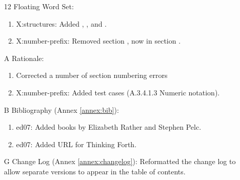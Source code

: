 \begin{itemize}
	\item[12] Floating Word Set:
		\begin{enumerate}
		\item \textsf{X:structures}: Added
			,
			, and
			.
		\item \textsf{X:number-prefix}:
			Removed section , now
			in section .
		\end{enumerate}

	\item[A] Rationale:
		\begin{enumerate}
		\item Corrected a number of section numbering errors
		\item \textsf{X:number-prefix}:
			Added test cases (A.3.4.1.3 Numeric notation).
		\end{enumerate}

	\item[B] Bibliography (Annex \ref{annex:bib}):
		\begin{enumerate}
		\item \textsf{ed07}: Added books by Elizabeth Rather
			and Stephen Pelc.
		\item \textsf{ed07}: Added URL for Thinking Forth.
		\end{enumerate}

	\item[G] Change Log (Annex \ref{annex:changelog}):
		Reformatted the change log to allow separate versions
		to appear in the table of contents.
	\end{itemize}



